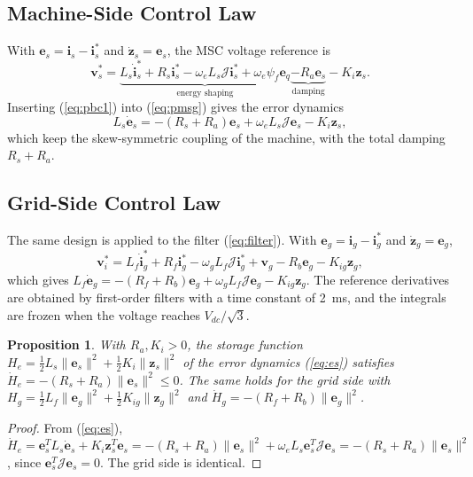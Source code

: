 \documentclass[11pt,a4paper]{article}
\newtheorem{proposition}{Proposition}
\newcommand{\bv}[1]{\mathbf{#1}}
\newcommand{\Jm}{\boldsymbol{\mathcal{J}}}
\begin{document}
\subsection{Machine-Side Control Law}
With $\bv{e}_s=\bv{i}_s-\bv{i}_s^*$ and $\dot{\bv{z}}_s=\bv{e}_s$, the MSC voltage reference is
\begin{equation}
\bv{v}_s^* = \underbrace{L_s\dot{\bv{i}}_s^* + R_s\bv{i}_s^* - \omega_eL_s\Jm\bv{i}_s^* + \omega_e\psi_f\bv{e}_q}_{\text{energy shaping}}
\underbrace{- R_a\bv{e}_s}_{\text{damping}} - K_i\bv{z}_s .
\label{eq:pbc1}
\end{equation}
Inserting (\ref{eq:pbc1}) into (\ref{eq:pmsg}) gives the error dynamics
\begin{equation}
L_s\dot{\bv{e}}_s=-(R_s+R_a)\bv{e}_s+\omega_eL_s\Jm\bv{e}_s-K_i\bv{z}_s ,
\label{eq:es}
\end{equation}
which keep the skew-symmetric coupling of the machine, with the total damping $R_s+R_a$.

\subsection{Grid-Side Control Law}
The same design is applied to the filter (\ref{eq:filter}). With $\bv{e}_g=\bv{i}_g-\bv{i}_g^*$ and
$\dot{\bv{z}}_g=\bv{e}_g$,
\begin{equation}
\bv{v}_i^* = L_f\dot{\bv{i}}_g^* + R_f\bv{i}_g^* - \omega_gL_f\Jm\bv{i}_g^* + \bv{v}_g
- R_b\bv{e}_g - K_{ig}\bv{z}_g ,
\label{eq:pbc2}
\end{equation}
which gives $L_f\dot{\bv{e}}_g=-(R_f+R_b)\bv{e}_g+\omega_gL_f\Jm\bv{e}_g-K_{ig}\bv{z}_g$. The reference
derivatives are obtained by first-order filters with a time constant of 2~ms, and the integrals are
frozen when the voltage reaches $V_{dc}/\sqrt3$.

\begin{proposition}
With $R_a,K_i>0$, the storage function $H_e=\frac12L_s\|\bv{e}_s\|^2+\frac12K_i\|\bv{z}_s\|^2$ of the
error dynamics (\ref{eq:es}) satisfies $\dot H_e=-(R_s+R_a)\|\bv{e}_s\|^2\le0$. The same holds for the
grid side with $H_g=\frac12L_f\|\bv{e}_g\|^2+\frac12K_{ig}\|\bv{z}_g\|^2$ and
$\dot H_g=-(R_f+R_b)\|\bv{e}_g\|^2$.
\end{proposition}
\begin{proof}
From (\ref{eq:es}), $\dot H_e=\bv{e}_s^TL_s\dot{\bv{e}}_s+K_i\bv{z}_s^T\bv{e}_s=-(R_s+R_a)\|\bv{e}_s\|^2
+\omega_eL_s\bv{e}_s^T\Jm\bv{e}_s=-(R_s+R_a)\|\bv{e}_s\|^2$, since $\bv{e}_s^T\Jm\bv{e}_s=0$. The grid
side is identical.
\end{proof}
\end{document}
